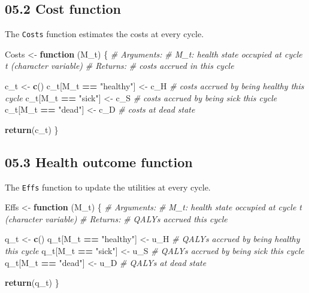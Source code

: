 \documentclass[]{article}
\newenvironment{Shaded}{\begin{snugshade}}{\end{snugshade}}
\newcommand{\KeywordTok}[1]{\textcolor[rgb]{0.13,0.29,0.53}{\textbf{#1}}}
\newcommand{\StringTok}[1]{\textcolor[rgb]{0.31,0.60,0.02}{#1}}
\newcommand{\CommentTok}[1]{\textcolor[rgb]{0.56,0.35,0.01}{\textit{#1}}}
\newcommand{\ControlFlowTok}[1]{\textcolor[rgb]{0.13,0.29,0.53}{\textbf{#1}}}
\newcommand{\OperatorTok}[1]{\textcolor[rgb]{0.81,0.36,0.00}{\textbf{#1}}}
\newcommand{\NormalTok}[1]{#1}
\begin{document}
\subsection{05.2 Cost function}\label{cost-function}

The \texttt{Costs} function estimates the costs at every cycle.

\begin{Shaded}
\begin{Highlighting}[]
\NormalTok{Costs <-}\StringTok{ }\ControlFlowTok{function}\NormalTok{ (M_t) \{}
  \CommentTok{# Arguments:}
    \CommentTok{# M_t: health state occupied at cycle t (character variable)}
  \CommentTok{# Returns: }
    \CommentTok{# costs accrued in this cycle}
  
\NormalTok{  c_t <-}\StringTok{ }\KeywordTok{c}\NormalTok{()}
\NormalTok{  c_t[M_t }\OperatorTok{==}\StringTok{ "healthy"}\NormalTok{] <-}\StringTok{ }\NormalTok{c_H  }\CommentTok{# costs accrued by being healthy this cycle}
\NormalTok{  c_t[M_t }\OperatorTok{==}\StringTok{ "sick"}\NormalTok{]    <-}\StringTok{ }\NormalTok{c_S  }\CommentTok{# costs accrued by being sick this cycle}
\NormalTok{  c_t[M_t }\OperatorTok{==}\StringTok{ "dead"}\NormalTok{]    <-}\StringTok{ }\NormalTok{c_D  }\CommentTok{# costs at dead state}
  
  \KeywordTok{return}\NormalTok{(c_t) }
\NormalTok{\}}
\end{Highlighting}
\end{Shaded}

\subsection{05.3 Health outcome function}\label{health-outcome-function}

The \texttt{Effs} function to update the utilities at every cycle.

\begin{Shaded}
\begin{Highlighting}[]
\NormalTok{Effs <-}\StringTok{ }\ControlFlowTok{function}\NormalTok{ (M_t) \{}
  \CommentTok{# Arguments:}
    \CommentTok{# M_t: health state occupied at cycle t (character variable)}
  \CommentTok{# Returns: }
    \CommentTok{# QALYs accrued this cycle}
  
\NormalTok{  q_t <-}\StringTok{ }\KeywordTok{c}\NormalTok{() }
\NormalTok{  q_t[M_t }\OperatorTok{==}\StringTok{ "healthy"}\NormalTok{] <-}\StringTok{ }\NormalTok{u_H  }\CommentTok{# QALYs accrued by being healthy this cycle}
\NormalTok{  q_t[M_t }\OperatorTok{==}\StringTok{ "sick"}\NormalTok{]    <-}\StringTok{ }\NormalTok{u_S  }\CommentTok{# QALYs accrued by being sick this cycle}
\NormalTok{  q_t[M_t }\OperatorTok{==}\StringTok{ "dead"}\NormalTok{]    <-}\StringTok{ }\NormalTok{u_D  }\CommentTok{# QALYs at dead state}
  
  \KeywordTok{return}\NormalTok{(q_t)  }
\NormalTok{\}}
\end{Highlighting}
\end{Shaded}
\end{document}
